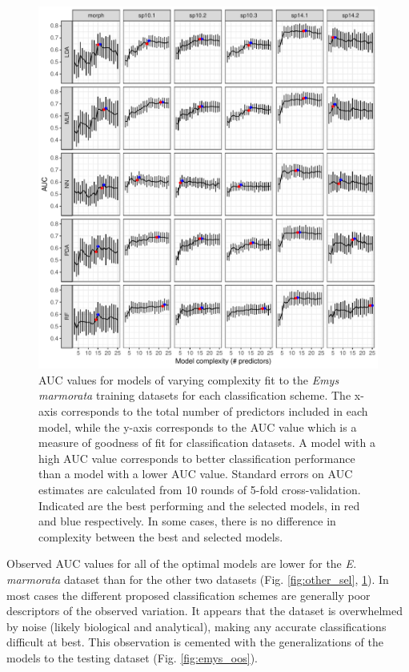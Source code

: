\documentclass[12pt,letterpaper]{article}
\begin{document}
\begin{figure}[ht]
  \centering
  \includegraphics[height = \textheight, width = \textwidth, keepaspectratio = true]{figure/emys_model_sel}
  \caption{AUC values for models of varying complexity fit to the \textit{Emys marmorata} training datasets for each classification scheme. The x-axis corresponds to the total number of predictors included in each model, while the y-axis corresponds to the AUC value which is a measure of goodness of fit for classification datasets. A model with a high AUC value corresponds to better classification performance than a model with a lower AUC value. Standard errors on AUC estimates are calculated from 10 rounds of 5-fold cross-validation. Indicated are the best performing and the selected models, in red and blue respectively. In some cases, there is no difference in complexity between the best and selected models.}
  \label{fig:emys_sel}
\end{figure}

Observed AUC values for all of the optimal models are lower for the \textit{E. marmorata} dataset than for the other two datasets (Fig. \ref{fig:other_sel}, \ref{fig:emys_sel}). In most cases the different proposed classification schemes are generally poor descriptors of the observed variation. It appears that the dataset is overwhelmed by noise (likely biological and analytical), making any accurate classifications difficult at best. This observation is cemented with the generalizations of the models to the testing dataset (Fig. \ref{fig:emys_oos}).
\end{document}
